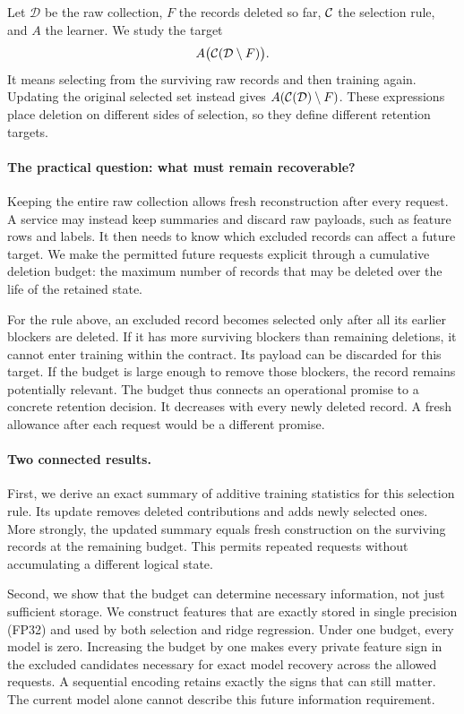Let $\mathcal D$ be the raw collection, $F$ the records deleted so far,
$\mathcal C$ the selection rule, and $A$ the learner. We study the target
\begin{equation}\label{eq:target}
                 A\bigl(\mathcal C(\mathcal D\setminus F)\bigr).
\end{equation}
It means selecting from the surviving raw records and then training again.
Updating the original selected set instead gives
$A(\mathcal C(\mathcal D)\setminus F)$. These expressions place deletion on
different sides of selection, so they define different retention targets.

\paragraph{The practical question: what must remain recoverable?}
Keeping the entire raw collection allows fresh reconstruction after every
request. A service may instead keep summaries and discard raw payloads,
such as feature rows and labels. It then needs to know which excluded
records can affect a future target. We make the permitted future requests
explicit through a cumulative deletion budget: the maximum number of
records that may be deleted over the life of the retained state.

For the rule above, an excluded record becomes selected only after all
its earlier blockers are deleted. If it has more surviving blockers than
remaining deletions, it cannot enter training within the contract. Its
payload can be discarded for this target. If the budget is large enough
to remove those blockers, the record remains potentially relevant.
The budget thus connects an operational promise to a concrete retention
decision. It decreases with every newly deleted record. A fresh allowance after
each request would be a different promise.

\paragraph{Two connected results.}
First, we derive an exact summary of additive training statistics for this
selection rule. Its update removes deleted contributions and adds newly
selected ones. More strongly, the updated summary equals fresh construction
on the surviving records at the remaining budget. This permits repeated
requests without accumulating a different logical state.

Second, we show that the budget can determine necessary information, not
just sufficient storage. We construct features that are exactly stored
in single precision (FP32) and used by both selection and ridge regression.
Under one budget, every model is zero. Increasing the budget by one makes
every private feature sign in the excluded candidates necessary for exact
model recovery across the allowed requests. A sequential encoding retains
exactly the signs that can still matter. The current model alone cannot
describe this future information requirement.

